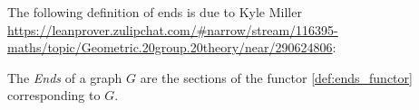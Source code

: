 The following definition of ends is due to Kyle Miller \url{https://leanprover.zulipchat.com/#narrow/stream/116395-maths/topic/Geometric.20group.20theory/near/290624806}:

\begin{definition}[Ends]
  \label{def:ends_cat}
  \leanok

  The \emph{Ends} of a graph $G$ are the sections of the functor \ref{def:ends_functor} corresponding to $G$.
\end{definition}
